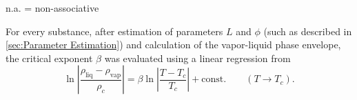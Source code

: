 \documentclass[preprint,12pt,3p]{elsarticle}
\begin{document}
\begin{table}[!ht]
\centering
\caption{Parameters of the CPA equation of state used in this work.}
\label{table:CPA_parameters}
\raggedright n.a.
= non-associative
\end{table}

\begin{table}[!ht]
\centering
\caption{Experimental critical data obtained from the NIST database \cite{nistfluids}.}
\label{table:crit_exp}
\end{table}

For every substance, after estimation of parameters $L$ and $\phi$ (such as described in \cref{sec:Parameter Estimation}) and calculation of the vapor-liquid phase envelope, the critical exponent $\beta$ was evaluated using a linear regression from
\begin{equation} \label{eq:beta_law}
\ln\left|\frac{\rho_\text{liq}-\rho_\text{vap}}{\rho_{c}}\right| = \beta \ln\left|\frac{T-T_{c}}{T_{c}}\right|+\text{const.} \qquad (T \rightarrow T_{c}).
\end{equation}
\end{document}
